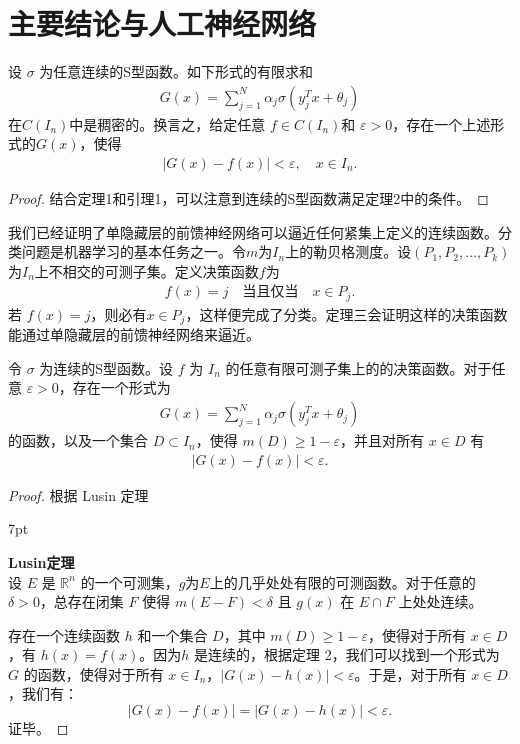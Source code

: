 \documentclass[12pt]{article}
\newenvironment{formal}{%
\def\FrameCommand{%
\hspace{1pt}%
{\color{Blue}\vrule width 2pt}%
{\color{formalshade}\vrule width 4pt}%
\colorbox{formalshade}%
}%
\MakeFramed{\advance\hsize-\width\FrameRestore}%
\noindent\hspace{-4.55pt}%
\begin{adjustwidth}{}{7pt}%
\vspace{2pt}\vspace{2pt}%
}
{%
\vspace{2pt}\end{adjustwidth}\endMakeFramed%
}
\begin{document}
\section{主要结论与人工神经网络}

\begin{mytheorem}
    设  $\sigma$ 为任意连续的S型函数。如下形式的有限求和
\begin{align*}
G(x) = \sum_{j=1}^{N} \alpha_j \sigma(y_j^T x + \theta_j)
\end{align*}
在$C(I_n)$中是稠密的。换言之，给定任意 $f \in C(I_n)$和 $\varepsilon > 0$，存在一个上述形式的$G(x)$，使得
\begin{align*}
|G(x) - f(x)| < \varepsilon, \quad x \in I_n.
\end{align*}
\end{mytheorem}

\begin{proof}
    结合定理1和引理1，可以注意到连续的S型函数满足定理2中的条件。
\end{proof}

我们已经证明了单隐藏层的前馈神经网络可以逼近任何紧集上定义的连续函数。分类问题是机器学习的基本任务之一。令$m$为$I_n$上的勒贝格测度。设$( P_1, P_2, \dots, P_k )$为$I_n$上不相交的可测子集。定义决策函数$f$为
\begin{align*}
    f(x)=j\quad \text{当且仅当} \quad x\in P_j.
\end{align*}
若 $f(x) = j$，则必有$x \in P_j$，这样便完成了分类。定理三会证明这样的决策函数能通过单隐藏层的前馈神经网络来逼近。
\begin{mytheorem}
    令 $\sigma$ 为连续的S型函数。设 $f$ 为 $I_n$ 的任意有限可测子集上的的决策函数。对于任意 $\varepsilon > 0$，存在一个形式为
\begin{align*}
G(x) = \sum_{j=1}^{N} \alpha_j \sigma(y_j^T x + \theta_j)
\end{align*}
的函数，以及一个集合 $D \subset I_n$，使得 $m(D) \geq 1 - \varepsilon$，并且对所有 $x \in D$ 有
\begin{align*}
|G(x) - f(x)| < \varepsilon.
\end{align*}
\end{mytheorem}

\begin{proof}
根据 Lusin 定理
\begin{formal}
    \textbf{Lusin定理}\\
    设 $E$ 是 $\mathbb{R}^n$ 的一个可测集，$g$为$E$上的几乎处处有限的可测函数。对于任意的 \( \delta > 0 \)，总存在闭集 $F$ 使得 $m(E - F) < \delta$ 且 $ g(x) $ 在 $ E\cap F $ 上处处连续。
\end{formal}
存在一个连续函数 $h$  和一个集合  $D$，其中  $m(D) \geq 1 - \varepsilon$，使得对于所有  $x \in D$，有 $h(x) = f(x)$。因为$h$ 是连续的，根据定理 2，我们可以找到一个形式为  $G$ 的函数，使得对于所有 $x \in I_n$，$|G(x) - h(x)| < \varepsilon$。于是，对于所有 $x \in D$，我们有：
$$
|G(x) - f(x)| = |G(x) - h(x)| < \varepsilon.$$
证毕。
\end{proof}
\end{document}
